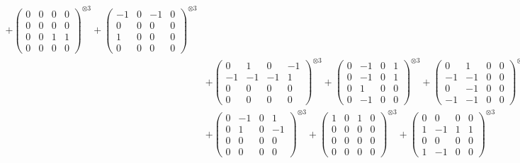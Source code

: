 \documentclass{article}
\begin{document}
{\begin{align}
            + \begin{pmatrix} 0 & 0 & 0 & 0 \\ 0 & 0 & 0 & 0 \\ 0 & 0 & 1 & 1 \\ 0 & 0 & 0 & 0 \end{pmatrix}^{\otimes 3} 
            + \begin{pmatrix} -1 & 0 & -1 & 0 \\ 0 & 0 & 0 & 0 \\ 1 & 0 & 0 & 0 \\ 0 & 0 & 0 & 0 \end{pmatrix}^{\otimes 3} \\
        &+ \label{Rs16-Rc11-Solution-32-c10} \begin{pmatrix} 0 & 1 & 0 & -1 \\ -1 & -1 & -1 & 1 \\ 0 & 0 & 0 & 0 \\ 0 & 0 & 0 & 0 \end{pmatrix}^{\otimes 3} 
            + \begin{pmatrix} 0 & -1 & 0 & 1 \\ 0 & -1 & 0 & 1 \\ 0 & 1 & 0 & 0 \\ 0 & -1 & 0 & 0 \end{pmatrix}^{\otimes 3} 
            + \begin{pmatrix} 0 & 1 & 0 & 0 \\ -1 & -1 & 0 & 0 \\ 0 & -1 & 0 & 0 \\ -1 & -1 & 0 & 0 \end{pmatrix}^{\otimes 3} \\
        &+ \label{Rs16-Rc11-Solution-32-c13} \begin{pmatrix} 0 & -1 & 0 & 1 \\ 0 & 1 & 0 & -1 \\ 0 & 0 & 0 & 0 \\ 0 & 0 & 0 & 0 \end{pmatrix}^{\otimes 3} 
            + \begin{pmatrix} 1 & 0 & 1 & 0 \\ 0 & 0 & 0 & 0 \\ 0 & 0 & 0 & 0 \\ 0 & 0 & 0 & 0 \end{pmatrix}^{\otimes 3} 
            + \begin{pmatrix} 0 & 0 & 0 & 0 \\ 1 & -1 & 1 & 1 \\ 0 & 0 & 0 & 0 \\ 1 & -1 & 0 & 0 \end{pmatrix}^{\otimes 3} \\

\end{align}}
\end{document}
